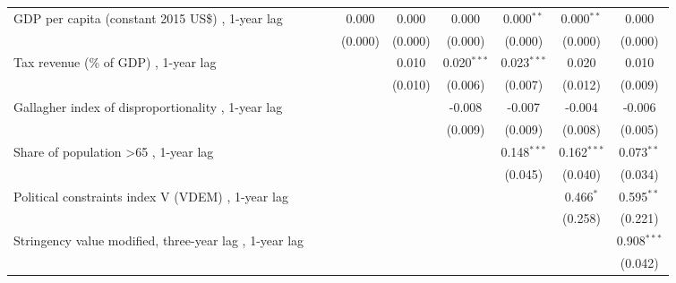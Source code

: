 \begin{table}[htbp]
\begin{tabular}{lcccccccc}
      GDP per capita (constant 2015 US\$) , 1-year lag                      &              &              & 0.000       & 0.000   & 0.000         & 0.000$^{**}$  & 0.000$^{**}$  & 0.000\\   
                                                                            &              &              & (0.000)     & (0.000) & (0.000)       & (0.000)       & (0.000)       & (0.000)\\   
      Tax revenue (\% of GDP) , 1-year lag                                  &              &              &             & 0.010   & 0.020$^{***}$ & 0.023$^{***}$ & 0.020         & 0.010\\   
                                                                            &              &              &             & (0.010) & (0.006)       & (0.007)       & (0.012)       & (0.009)\\   
      Gallagher index of disproportionality , 1-year lag                    &              &              &             &         & -0.008        & -0.007        & -0.004        & -0.006\\   
                                                                            &              &              &             &         & (0.009)       & (0.009)       & (0.008)       & (0.005)\\   
      Share of population >65 , 1-year lag                                  &              &              &             &         &               & 0.148$^{***}$ & 0.162$^{***}$ & 0.073$^{**}$\\   
                                                                            &              &              &             &         &               & (0.045)       & (0.040)       & (0.034)\\   
      Political constraints index V (VDEM) , 1-year lag                     &              &              &             &         &               &               & 0.466$^{*}$   & 0.595$^{**}$\\   
                                                                            &              &              &             &         &               &               & (0.258)       & (0.221)\\   
      Stringency value modified, three-year lag , 1-year lag                &              &              &             &         &               &               &               & 0.908$^{***}$\\   
                                                                            &              &              &             &         &               &               &               & (0.042)\\   

\end{tabular}
\end{table}
